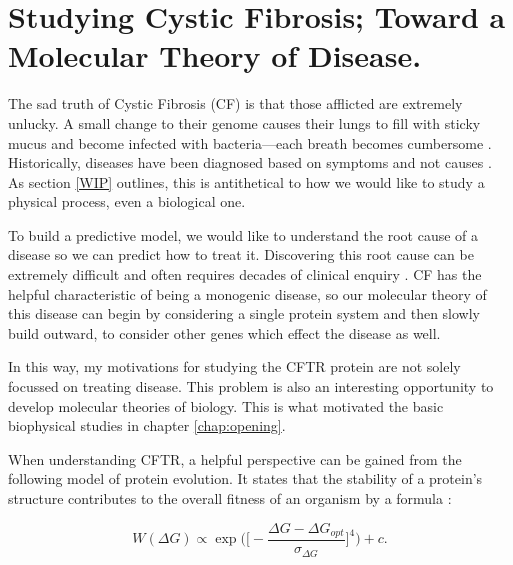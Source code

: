 
\section{Studying Cystic Fibrosis; Toward a Molecular Theory of Disease.} 

The sad truth of Cystic Fibrosis (CF) is that those afflicted are extremely unlucky. A small change to their genome causes their lungs to fill with sticky mucus and become infected with bacteria---each breath becomes cumbersome \cite{katkin2022}. Historically, diseases have been diagnosed based on symptoms and not causes \cite{foucault1994}. As section \ref{WIP} outlines, this is antithetical to how we would like to study a physical process, even a biological one. 

To build a predictive model, we would like to understand the root cause of a disease so we can predict how to treat it. Discovering this root cause can be extremely difficult and often requires decades of clinical enquiry \cite{dubois2016, tsui2013}. CF has the helpful characteristic of being a monogenic disease, so our molecular theory of this disease can begin by considering a single protein system and then slowly build outward, to  consider other genes which effect the disease as well.

In this way, my motivations for studying the CFTR protein are not solely focussed on treating disease. This problem is also an interesting opportunity to develop molecular theories of biology. This is what motivated the basic biophysical studies in chapter \ref{chap:opening}. 

When understanding CFTR, a helpful perspective can be gained from the following model of protein evolution. It states that the stability of a protein's structure contributes to the overall fitness of an organism by a formula \cite{depristo2005}:

\begin{equation}
	\label{fitness_equation}
	W(\Delta G) \propto \exp\bigg(\bigg[-\frac{\Delta G - \Delta G_{opt}}{\sigma_{\Delta G}}\bigg]^4\bigg) + c.
\end{equation}

